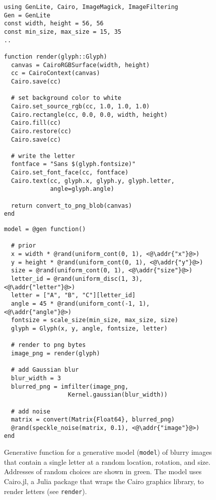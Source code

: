 \begin{figure}[t]
\begin{minipage}[t]{0.5\textwidth}
\begin{lstlisting}
using GenLite, Cairo, ImageMagick, ImageFiltering
Gen = GenLite
const width, height = 56, 56
const min_size, max_size = 15, 35
..

function render(glyph::Glyph)
  canvas = CairoRGBSurface(width, height)
  cc = CairoContext(canvas)
  Cairo.save(cc)

  # set background color to white
  Cairo.set_source_rgb(cc, 1.0, 1.0, 1.0)
  Cairo.rectangle(cc, 0.0, 0.0, width, height)
  Cairo.fill(cc)
  Cairo.restore(cc)
  Cairo.save(cc)

  # write the letter
  fontface = "Sans $(glyph.fontsize)"
  Cairo.set_font_face(cc, fontface)
  Cairo.text(cc, glyph.x, glyph.y, glyph.letter,
             angle=glyph.angle)

  return convert_to_png_blob(canvas)
end
\end{lstlisting}
\end{minipage}%
\begin{minipage}[t]{0.5\textwidth}
\begin{lstlisting}
model = @gen function()

  # prior
  x = width * @rand(uniform_cont(0, 1), <@\addr{"x"}@>)
  y = height * @rand(uniform_cont(0, 1), <@\addr{"y"}@>)
  size = @rand(uniform_cont(0, 1), <@\addr{"size"}@>)
  letter_id = @rand(uniform_disc(1, 3), <@\addr{"letter"}@>)
  letter = ["A", "B", "C"][letter_id]
  angle = 45 * @rand(uniform_cont(-1, 1), <@\addr{"angle"}@>)
  fontsize = scale_size(min_size, max_size, size)
  glyph = Glyph(x, y, angle, fontsize, letter)

  # render to png bytes
  image_png = render(glyph)

  # add Gaussian blur
  blur_width = 3
  blurred_png = imfilter(image_png,
                  Kernel.gaussian(blur_width))

  # add noise
  matrix = convert(Matrix{Float64}, blurred_png)
  @rand(speckle_noise(matrix, 0.1), <@\addr{"image"}@>)
end
\end{lstlisting}
\end{minipage}
\caption{Generative function for a generative model (\texttt{model}) of blurry images that contain a single letter at a random location, rotation, and size.
Addresses of random choices are shown in green.
The model uses Cairo.jl, a Julia package that wraps the Cairo graphics library, to render letters (see \texttt{render}).
}
\label{fig:model-code-figure}
\end{figure}
